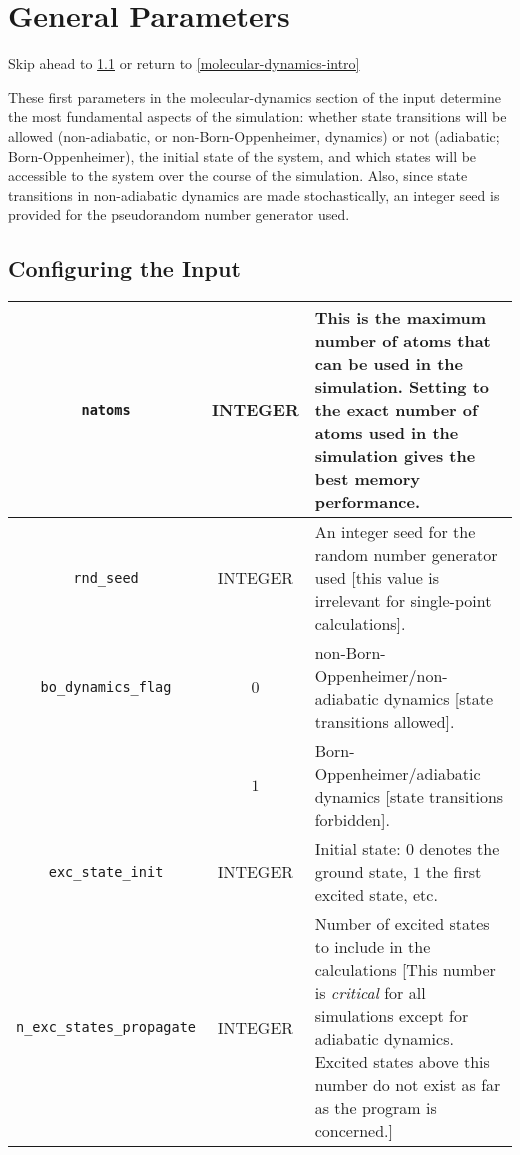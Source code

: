 \documentclass[12pt,letter,footinclude=true,headinclude=true,hyphens]{book} %
\begin{document}
    \section{General Parameters}
    \label{general-parameters}
    
    Skip ahead to \ref{general-parameters-input} or return to \ref{molecular-dynamics-intro}
    
    These first parameters in the molecular-dynamics section of the input determine the most fundamental aspects of the simulation: whether state transitions will be allowed (non-adiabatic, or non-Born-Oppenheimer, dynamics) or not (adiabatic; Born-Oppenheimer), the initial state of the system, and which states will be accessible to the system over the course of the simulation.
    Also, since state transitions in non-adiabatic dynamics are made stochastically, an integer seed is provided for the pseudorandom number generator used.
    
    \subsection{Configuring the Input}
    \label{general-parameters-input}
    
    \begin{tabular}{ | c | c | p{7cm} | }
    \hline
    \texttt{natoms} & INTEGER & This is the maximum number of atoms that can be used in the simulation. Setting to the exact number of atoms used in the simulation gives the best memory performance.\\
    \hline
    \texttt{rnd\_seed} & INTEGER & An integer seed for the random number generator used [this value is irrelevant for single-point calculations].\\
    \hline
    \texttt{bo\_dynamics\_flag} & $0$ & non-Born-Oppenheimer/non-adiabatic dynamics [state transitions allowed].\\
    & $1$ & Born-Oppenheimer/adiabatic dynamics [state transitions forbidden].\\
    \hline
    \texttt{exc\_state\_init} & INTEGER & Initial state: $0$ denotes the ground state, $1$ the first excited state, etc.\\
    \hline
    \texttt{n\_exc\_states\_propagate} & INTEGER & Number of excited states to include in the calculations [This number is \emph{critical} for all simulations except for adiabatic dynamics. Excited states above this number do not exist as far as the program is concerned.]\\
    \hline
    \end{tabular}
    
\end{document}
